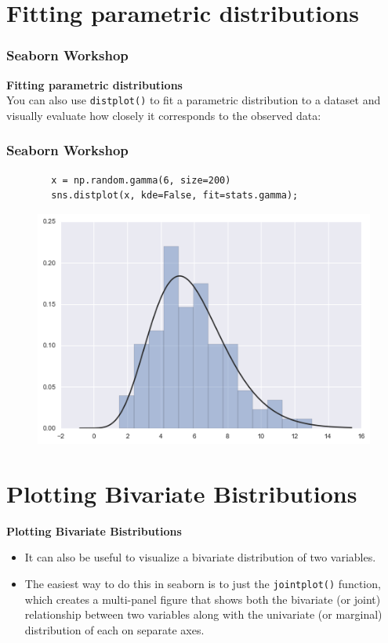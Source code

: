 \documentclass{beamer}
\begin{document}
\section{Fitting parametric distributions}
\begin{frame}[fragile]
	\frametitle{Seaborn Workshop}\large
	\noindent \textbf{Fitting parametric distributions}\\
	You can also use \texttt{distplot()} to fit a parametric distribution to a dataset and visually evaluate how closely it corresponds to the observed data:
	
\end{frame}
\begin{frame}[fragile]
	\frametitle{Seaborn Workshop}
	\begin{framed}
		\begin{verbatim}
		x = np.random.gamma(6, size=200)
		sns.distplot(x, kde=False, fit=stats.gamma);
		\end{verbatim}
	\end{framed}
	
	\begin{figure}
		\centering
		\includegraphics[width=0.7\linewidth]{images/distributions_26_0}
		\caption{}
		\label{fig:distributions_26_0}
	\end{figure}
\end{frame}


\section{Plotting Bivariate Bistributions}
\begin{frame}[fragile]
	\large
	\noindent \textbf{Plotting Bivariate Bistributions}
	
	\begin{itemize}
		\item It can also be useful to visualize a bivariate distribution of two variables. 
		\item The easiest way to do this in seaborn is to just the \texttt{jointplot()} function, which creates a multi-panel figure that shows both the bivariate (or joint) relationship between two variables along with the univariate (or marginal) distribution of each on separate axes.
	\end{itemize}
	
	
\end{frame}
\end{document}
